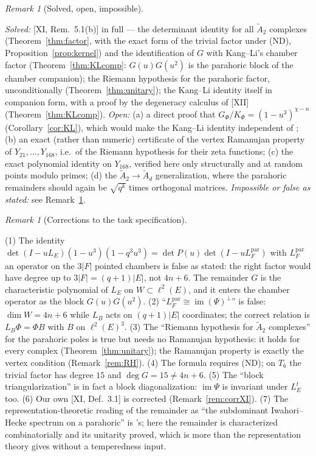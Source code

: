 \documentclass[11pt]{amsart}
\numberwithin{equation}{section}
\theoremstyle{definition}
\theoremstyle{remark}
\newtheorem{remark}[theorem]{Remark}
\newcommand{\LE}{L_E}
\newcommand{\LB}{L_B}
\newcommand{\Atwo}{\widetilde A_2}
\newcommand{\im}{\operatorname{im}}
\begin{document}
\begin{remark}[Solved, open, impossible]\label{rem:scope}
\begin{sloppypar}
\emph{Solved:} [XI, Rem.~5.1(b)] in full --- the determinant identity for all $\Atwo$ complexes
(Theorem~\ref{thm:factor}, with the exact form of the trivial factor under (ND),
Proposition~\ref{prop:kernel}) and the identification of $G$ with Kang--Li's chamber factor
(Theorem~\ref{thm:KLcomp}: $G(u)G(u^{2})$ is the parahoric block of the chamber companion);
the Riemann hypothesis for the parahoric factor, unconditionally (Theorem~\ref{thm:unitary});
the Kang--Li identity itself in companion form, with a proof by the degeneracy calculus of
[XII] (Theorem~\ref{thm:KLcomp}). \emph{Open:} (a) a direct proof that $G_\Phi/K_\Phi=
(1-u^{3})^{\chi-n}$ (Corollary~\ref{cor:KL}), which would make the Kang--Li identity
independent of \cite{KL}; (b) an exact (rather than numeric) certificate of the vertex
Ramanujan property of $Y_{21},\dots,Y_{168}$, i.e.\ of the Riemann hypothesis for their zeta
functions; (c) the exact polynomial identity on $Y_{168}$, verified here only structurally
and at random points modulo primes; (d) the $\Atwo\to\widetilde A_d$ generalization, where
the parahoric remainders should again be $\sqrt{q^{k}}$ times orthogonal matrices.
\emph{Impossible or false as stated:} see Remark~\ref{rem:corrections}.
\end{sloppypar}
\end{remark}

\begin{remark}[Corrections to the task specification]\label{rem:corrections}
\begin{sloppypar}
(1) The identity $\det(I-u\LE)(1-u^{3})(1-q^{3}u^{3})=\det P(u)\det(I-uL_F^{\mathrm{par}})$ with
$L_F^{\mathrm{par}}$ an operator on the $3|F|$ pointed chambers is false as stated: the right
factor would have degree up to $3|F|=(q{+}1)|E|$, not $4n+6$. The remainder $G$ is the
characteristic polynomial of $\LE$ on $W\subset\ell^{2}(E)$, and it enters the chamber
operator as the block $G(u)G(u^{2})$. (2) ``$L_F^{\mathrm{par}}\cong\im(\Psi)^{\perp}$'' is
false: $\dim W=4n+6$ while $\LB$ acts on $(q{+}1)|E|$ coordinates; the correct relation is
$\LB\Phi=\Phi B$ with $B$ on $\ell^{2}(E)^{3}$. (3) The ``Riemann hypothesis for $\Atwo$
complexes'' for the parahoric poles is true but needs no Ramanujan hypothesis: it holds for
every complex (Theorem~\ref{thm:unitary}); the Ramanujan property is exactly the vertex
condition (Remark~\ref{rem:RH}). (4) The formula requires (ND); on $T_6$ the trivial factor
has degree $15$ and $\deg G=15\ne4n+6$. (5) The ``block triangularization'' is in fact a
block diagonalization: $\im\Psi$ is invariant under $\LE^{t}$ too. (6) Our own [XI,
Def.~3.1] is corrected (Remark~\ref{rem:corrXI}). (7) The representation-theoretic reading of
the remainder as ``the subdominant Iwahori--Hecke spectrum on a parahoric'' is \cite{KLW}'s;
here the remainder is characterized combinatorially and its unitarity proved, which is more
than the representation theory gives without a temperedness input.
\end{sloppypar}
\end{remark}
\end{document}
